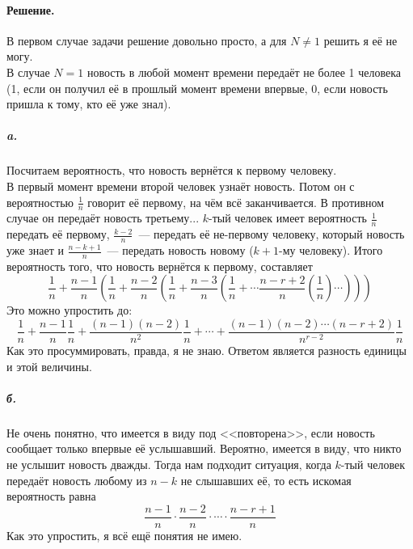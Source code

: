 \documentclass{article}
\begin{document}
    \paragraph{Решение.}
    В первом случае задачи решение довольно просто, а для $N\neq1$ решить я её не могу.\\
    В случае $N=1$ новость в любой момент времени передаёт не более 1 человека (1, если он получил её в прошлый момент времени впервые, 0, если новость пришла к тому, кто её уже знал).
    \subparagraph{a.}
    Посчитаем вероятность, что новость вернётся к первому человеку.\\
    В первый момент времени второй человек узнаёт новость. Потом он с вероятностью $\frac1n$ говорит её первому, на чём всё заканчивается. В противном случае он передаёт новость третьему... $k$-тый человек имеет вероятность $\frac1n$ передать её первому, $\frac{k-2}n$~--- передать её не-первому человеку, который новость уже знает и $\frac{n-k+1}n$~--- передать новость новому ($k+1$-му человеку). Итого вероятность того, что новость вернётся к первому, составляет
    $$
    \frac1n+\frac{n-1}n\left(\frac1n+\frac{n-2}n\left(\frac1n+\frac{n-3}n\left(\frac1n+\cdots\frac{n-r+2}n\left(\frac1n\right)\cdots\right)\right)\right)
    $$
    Это можно упростить до:
    $$
    \frac1n+\frac{n-1}n\frac1n+\frac{(n-1)(n-2)}{n^2}\frac1n+\cdots+\frac{(n-1)(n-2)\cdots(n-r+2)}{n^{r-2}}\frac1n
    $$
    Как это просуммировать, правда, я не знаю. Ответом является разность единицы и этой величины.
    \subparagraph{б.}
    Не очень понятно, что имеется в виду под <<повторена>>, если новость сообщает только впервые её услышавший. Вероятно, имеется в виду, что никто не услышит новость дважды. Тогда нам подходит ситуация, когда $k$-тый человек передаёт новость любому из $n-k$ не слышавших её, то есть искомая вероятность равна
    $$
    \frac{n-1}n\cdot\frac{n-2}n\cdot\cdots\cdot\frac{n-r+1}n
    $$
    Как это упростить, я всё ещё понятия не имею.
\end{document}
